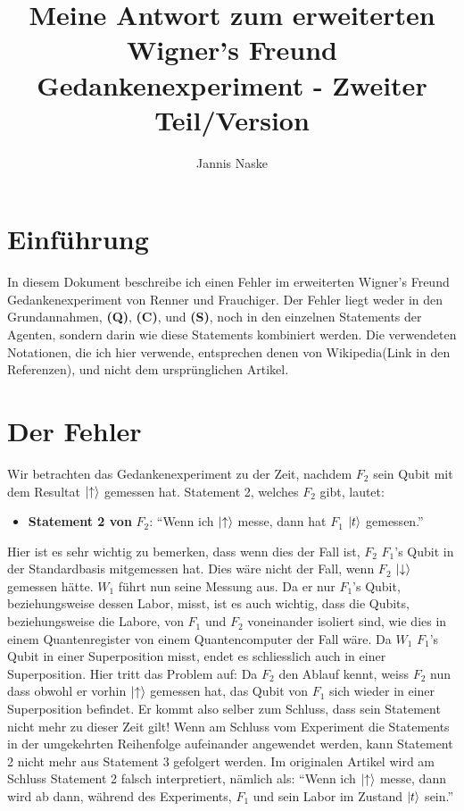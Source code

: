 \documentclass[a4paper]{article}
\title{Meine Antwort zum erweiterten Wigner's Freund Gedankenexperiment - Zweiter Teil/Version}
\author{Jannis Naske}
\begin{document}
\maketitle
\afterpage{\cfoot{\thepage}}
\section*{Einführung}
In diesem Dokument beschreibe ich einen Fehler im erweiterten Wigner's Freund Gedankenexperiment von Renner und Frauchiger. Der Fehler liegt weder in den Grundannahmen, \textbf{(Q)}, \textbf{(C)}, und \textbf{(S)}, noch in den einzelnen Statements der Agenten, sondern darin wie diese Statements kombiniert werden. Die verwendeten Notationen, die ich hier verwende, entsprechen denen von Wikipedia(Link in den Referenzen), und nicht dem ursprünglichen Artikel.

\section*{Der Fehler}
Wir betrachten das Gedankenexperiment zu der Zeit, nachdem $F_2$ sein Qubit mit dem Resultat $\ket{\uparrow}$ gemessen hat. Statement 2, welches $F_2$ gibt, lautet:
\begin{itemize}
	\item \textbf{Statement 2 von} $F_2$: ``Wenn ich $\ket{\uparrow}$ messe, dann hat $F_1$ $\ket{t}$ gemessen.''
\end{itemize}
Hier ist es sehr wichtig zu bemerken, dass wenn dies der Fall ist, $F_2$ $F_1$'s Qubit in der Standardbasis mitgemessen hat. Dies wäre nicht der Fall, wenn $F_2$ $\ket{\downarrow}$ gemessen hätte. $W_1$ führt nun seine Messung aus. Da er nur $F_1$'s Qubit, beziehungsweise dessen Labor, misst, ist es auch wichtig, dass die Qubits, beziehungsweise die Labore, von $F_1$ und $F_2$ voneinander isoliert sind, wie dies in einem Quantenregister von einem Quantencomputer der Fall wäre. Da $W_1$ $F_1$'s Qubit in einer Superposition misst, endet es schliesslich auch in einer Superposition. Hier tritt das Problem auf: Da $F_2$ den Ablauf kennt, weiss $F_2$ nun dass obwohl er vorhin $\ket{\uparrow}$ gemessen hat, das Qubit von $F_1$ sich wieder in einer Superposition befindet. Er kommt also selber zum Schluss, dass sein Statement nicht mehr zu dieser Zeit gilt! Wenn am Schluss vom Experiment die Statements in der umgekehrten Reihenfolge aufeinander angewendet werden, kann Statement 2 nicht mehr aus Statement 3 gefolgert werden. Im originalen Artikel wird am Schluss Statement 2 falsch interpretiert, nämlich als: ``Wenn ich $\ket{\uparrow}$ messe, dann wird ab dann, während des Experiments, $F_1$ und sein Labor im Zustand $\ket{t}$ sein.''
\end{document}
